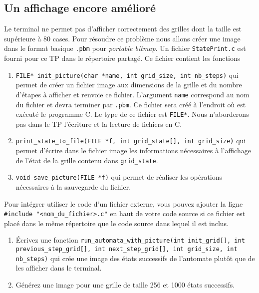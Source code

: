 \documentclass[11pt]{article}
\begin{document}
\subsection{Un affichage encore amélioré}
\label{sec:orgf34b47e}
Le terminal ne permet pas d'afficher correctement des grilles dont la taille est supérieure à 80 cases. Pour résoudre ce problème nous allons créer une image dans le format basique \texttt{.pbm} pour \emph{portable bitmap}.
Un fichier \texttt{StatePrint.c} est fourni pour ce TP dans le répertoire partagé.
Ce fichier contient les fonctions
\begin{enumerate}
\item \texttt{FILE* init\_picture(char *name, int grid\_size, int nb\_steps)} qui permet de créer un fichier image aux dimensions de la grille et du nombre d'étapes à afficher et renvoie ce fichier. L'argument \texttt{name} correspond au nom du fichier et devra terminer par \texttt{.pbm}. Ce fichier sera créé à l'endroit où est exécuté le programme C. Le type de ce fichier est \texttt{FILE*}. Nous n'aborderons pas dans le TP l'écriture et la lecture de fichiers en C.
\item \texttt{print\_state\_to\_file(FILE *f, int grid\_state[], int grid\_size)} qui permet d'écrire dans le fichier image les informations nécessaires à l'affichage de l'état de la grille contenu dans \texttt{grid\_state}.
\item \texttt{void save\_picture(FILE *f)} qui permet de réaliser les opérations nécessaires à la sauvegarde du fichier.
\end{enumerate}
Pour intégrer utiliser le code d'un fichier externe, vous pouvez ajouter la ligne \texttt{\#include "<nom\_du\_fichier>.c"} en haut de votre code source si ce fichier est placé dans le même répertoire que le code source dans lequel il est inclus.
\begin{enumerate}
\item Écrivez une fonction \texttt{run\_automata\_with\_picture(int init\_grid[], int previous\_step\_grid[], int next\_step\_grid[], int grid\_size, int nb\_steps)} qui crée une image des états successifs de l'automate plutôt que de les afficher dans le terminal.
\item Générez une image pour une grille de taille 256 et 1000 états successifs.
\end{enumerate}
\end{document}
